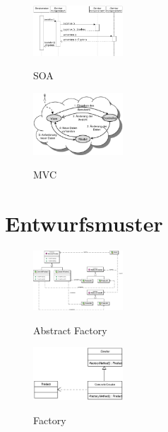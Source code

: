 \begin{figure}[h]
	\begin{center}
		\includegraphics[width=0.3\textwidth]{images/soa}
		\label{fig:soa}
		\caption{SOA}
	\end{center}
\end{figure}

\begin{figure}[h]
	\begin{center}
		\includegraphics[width=0.3\textwidth]{images/mvc}
		\label{fig:mvc}
		\caption{MVC}
	\end{center}
\end{figure}

\section{Entwurfsmuster}

\begin{figure}[h]
	\begin{center}
		\includegraphics[width=0.3\textwidth]{images/abstract_factory}
		\label{fig:abstract_factory}
		\caption{Abstract Factory}
	\end{center}
\end{figure}

\begin{figure}[h]
	\begin{center}
		\includegraphics[width=0.3\textwidth]{images/factory}
		\label{fig:factory}
		\caption{Factory}
	\end{center}
\end{figure}

